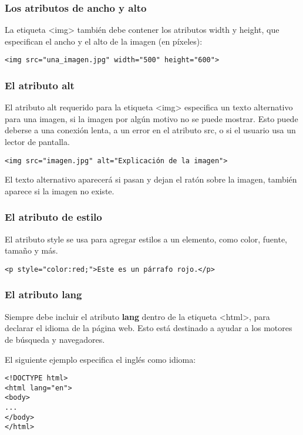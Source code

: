 \begin{frame}[fragile]
  \frametitle{Los atributos de ancho y alto}

  La etiqueta <img> también debe contener los atributos width y height,
  que especifican el ancho y el alto de la imagen (en píxeles):

  \vspace{\baselineskip}
  \begin{lstlisting}
<img src="una_imagen.jpg" width="500" height="600"> 
  \end{lstlisting}
\end{frame}

\begin{frame}[fragile]
  \frametitle{El atributo alt}

  El atributo alt requerido para la etiqueta <img> especifica un
  texto alternativo para una imagen, si la imagen por algún motivo no
  se puede mostrar. Esto puede deberse a una conexión lenta, a un error
  en el atributo src, o si el usuario usa un lector de pantalla.

  \vspace{\baselineskip}
  \begin{lstlisting}
<img src="imagen.jpg" alt="Explicación de la imagen"> 
  \end{lstlisting}

  \vspace{\baselineskip}
  El texto alternativo aparecerá si pasan y dejan el ratón sobre la imagen,
  también aparece si la imagen no existe.
\end{frame}

\begin{frame}[fragile]
  \frametitle{El atributo de estilo}

  El atributo style se usa para agregar estilos a un elemento,
  como color, fuente, tamaño y más.

  \vspace{\baselineskip}
  \begin{lstlisting}
<p style="color:red;">Este es un párrafo rojo.</p> 
  \end{lstlisting}
\end{frame}

\begin{frame}[fragile]
  \frametitle{El atributo lang}

  Siempre debe incluir el atributo \textbf{lang} dentro de la
  etiqueta <html>, para declarar el idioma de la página web.
  Esto está destinado a ayudar a los motores de búsqueda y
  navegadores.

  El siguiente ejemplo especifica el inglés como idioma:

  \vspace{\baselineskip}
  \begin{lstlisting}
<!DOCTYPE html>
<html lang="en">
<body>
...
</body>
</html>
  \end{lstlisting}
\end{frame}


